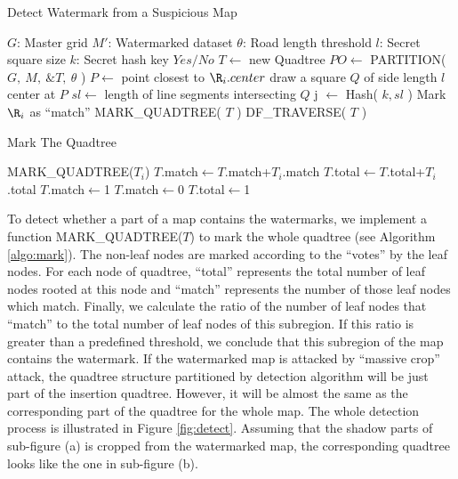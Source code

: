 \begin{algorithm}[th]
\caption{Detect Watermark from a Suspicious Map}
\label{algo:Detection}
\begin{algorithmic}[1]
\Require
\State 	  $G$: Master grid 
\State    $M'$: Watermarked dataset
\State    $\theta$: Road length threshold
\State    $l$: Secret square size
\State    $k$: Secret hash key
\Ensure
\State    $Yes/No$
\State $T \leftarrow$ new Quadtree
\State $PO \leftarrow$ PARTITION( $G,~M,~\&T,~\theta$ )
\State $P\leftarrow$ point closest to ${\R}_{i}.center$
\State draw a square $Q$ of side length $l$ center at $P$
\State $sl \leftarrow$ length of line segments intersecting $Q$
\State j $\leftarrow$ Hash( $k,sl$ )
\State Mark ${\R}_{i}$ as ``match''
\EndIf
\EndIf
\EndFor
\State MARK\_QUADTREE( $T$ )
\State DF\_TRAVERSE( $T$ )
\EndProcedure
\end{algorithmic}
\end{algorithm}

\begin{algorithm}[th]
\caption{Mark The Quadtree}
\label{algo:mark}
\begin{algorithmic}[1]
\Statex
{}
\State MARK\_QUADTREE(${T}_{i}$)
\State $T$.match$\leftarrow$$T$.match+${T}_{i}$.match
\State $T$.total$\leftarrow$$T$.total+${T}_{i}$.total 
\EndFor
\Else{}
\State $T$.match$\leftarrow$1
\Else{}
\State $T$.match$\leftarrow$0
\EndIf
\State $T$.total$\leftarrow$1
\EndIf\\
\Return
\EndFunction
\end{algorithmic}
\end{algorithm}



To detect whether a part of a map contains the watermarks, we implement a 
function MARK\_QUADTREE($T$) to mark the whole quadtree 
(see Algorithm \ref{algo:mark}). The non-leaf nodes are marked according to the
``votes'' by the leaf nodes. For each node of quadtree, 
``total'' represents the total number of leaf nodes rooted at this node
and ``match'' represents the number of those leaf nodes which match.
Finally, we calculate the ratio of the number of leaf nodes that 
``match'' to the total number of leaf nodes of this subregion. 
If this ratio is greater than a predefined threshold, 
we conclude that this subregion of the map contains the watermark.
If the watermarked map is attacked by ``massive crop'' attack, 
the quadtree structure partitioned by detection algorithm will be 
just part of the insertion quadtree. 
However, it will be almost the same as the corresponding part of the quadtree 
for the whole map. 
The whole detection process is illustrated in Figure \ref{fig:detect}. 
Assuming that the shadow parts of sub-figure (a) is 
cropped from the watermarked map, 
the corresponding quadtree looks like the one in sub-figure (b).

